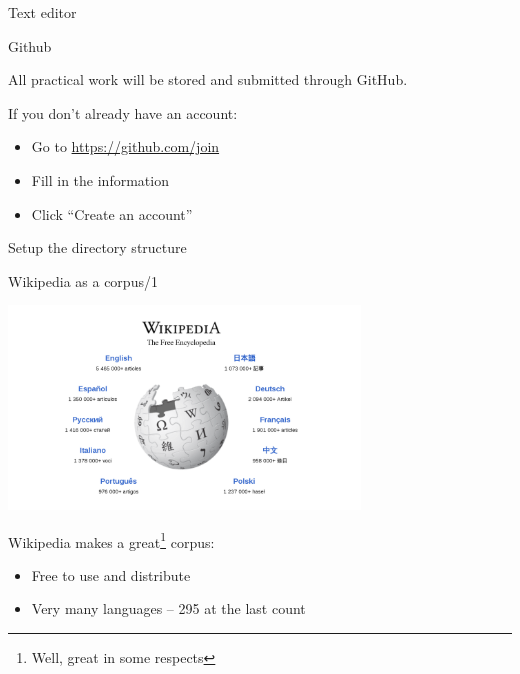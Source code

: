 \documentclass[10pt, compress]{beamer}
\begin{document}
\begin{frame}{Text editor}



\end{frame}

\begin{frame}{Github}

All practical work will be stored and submitted through GitHub.

If you don't already have an account:
\begin{itemize}
 \item Go to \url{https://github.com/join}
 \item Fill in the information
 \item Click ``Create an account''
\end{itemize}



\end{frame}


\begin{frame}{Setup the directory structure}

\end{frame}

\begin{frame}{Wikipedia as a corpus/1}

\begin{center}
\includegraphics[width=0.70\textwidth]{graphics/wikipedia-front.png}
\end{center}

Wikipedia makes a great\footnote{Well, great in some respects} corpus:

\begin{itemize}
   \item Free to use and distribute
   \item Very many languages -- 295 at the last count
\end{itemize}

\end{frame}
\end{document}
